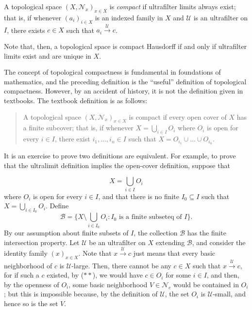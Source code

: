 \documentclass{scrartcl}
\begin{document}
\begin{definition}
\label{D:compactness}
A topological space $(X,\mathscr{N}_x)_{x\in X}$ is \emph{compact} if ultrafilter limits always exist; that is, if whenever $(a_i)_{i\in X}$ is an indexed family in $X$ and $\mathscr{U}$ is an ultrafilter on $I$, there exists $c\in X$ such that $a_i\overset{\mathscr{U}}\to c$.
\end{definition}

Note that, then, a topological space is compact Hausdorff if and only if ultrafilter limits exist and are unique in $X$.

The concept of topological compactness is fundamental in foundations of mathematics, and the preceding definition is the ``useful'' definition of topological compactness. However, by an accident of history, it is not the definition given in textbooks. The textbook definition is as follows: 

\begin{quote}
A topological space $(X,\mathscr{N}_x)_{x\in X}$ is compact if every open cover of $X$ has a finite subcover; that is, if whenever $X=\bigcup_{i\in I} O_i$ where $O_i$ is open for every $i\in I$, there exist $i_1,\dots, i_n\in I$ such that $X=O_{i_1}\cup\dots\cup O_{i_n}$.
\end{quote}

It is an exercise to prove two definitions are equivalent. For example, to prove that the ultralimit definition implies the open-cover definition, suppose that 

\[
\tag{$**$}
X=\bigcup_{i\in I} O_i
\]
where $O_i$ is open for every $i\in I$,  and that there is no finite $I_0\subseteq I$ such that $X=\bigcup_{i\in I_0} O_i$. Define
\[
\mathscr{B}=\{X\setminus \bigcup_{i\in I_0} O_i \colon
\text{$I_0$ is a finite subseteq of $I$}  \}.
\]
By our assumption about finite subsets of $I$, the collection $\mathscr{B}$ has the finite intersection property. Let $\mathscr{U}$ be an ultrafilter on $X$ extending $\mathscr{B}$, and consider the identity family $(x)_{x\in X}$. Note that $x\overset{\mathscr{U}}\to c$ just means that every basic neighborhood of $c$ is $\mathscr{U}$-large. Then, there cannot be any $c\in X$ such that $x\overset{\mathscr{U}}\to c$, for if such a $c$ existed, by ($**$), we would have $c\in O_i$ for some $i\in I$, and then, by the openness of $O_i$, some basic neighborhood $V\in\mathscr{N}_c$ would be contained in $O_i$; but this is impossible because, by the definition of $\mathscr{U}$, the set $O_i$ is $\mathscr{U}$-small, and hence so is the set $V$.
\end{document}
